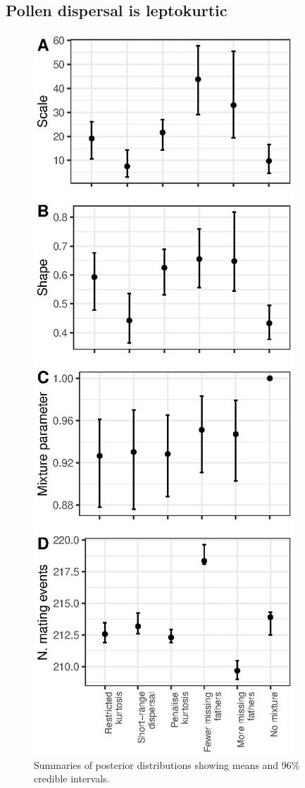 \documentclass[10pt, a4paper, twocolumn]{article} %
\begin{document}
\subsection{Pollen dispersal is leptokurtic}

\begin{figure}
\includegraphics{posterior_distributions.eps}
\caption{Summaries of posterior distributions showing means and 96\% credible intervals.}
\label{posterior_summaries}
\end{figure}
\end{document}
